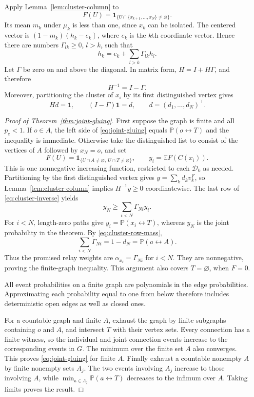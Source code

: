 \documentclass[11pt]{article}
\theoremstyle{definition}
\begin{document}
Apply Lemma~\ref{lem:cluster-column} to
\[
 F(U)=\mathbf1_{\{U\cap\{x_{k+1},\ldots,x_N\}\ne\varnothing\}}.
\]
Its mean $m_k$ under $\mu_k$ is less than one, since $x_k$ can be
isolated.  The centered vector is $(1-m_k)(h_k-e_k)$, where $e_k$
is the $k$th coordinate vector.  Hence there are numbers
$\Gamma_{lk}\ge0$, $l>k$, such that
\[
 h_k=e_k+\sum_{l>k}\Gamma_{lk}h_l.
\]
Let $\Gamma$ be zero on and above the diagonal.  In matrix form,
$H=I+H\Gamma$, and therefore
\begin{equation}
\label{eq:cluster-inverse}
 H^{-1}=I-\Gamma.
\end{equation}
Moreover, partitioning the cluster of $x_i$ by its first distinguished
vertex gives
\begin{equation}
\label{eq:cluster-row-mass}
 Hd=\mathbf1,\qquad (I-\Gamma)\mathbf1=d,
 \qquad d=(d_1,\ldots,d_N)^{\mathsf T}.
\end{equation}

\begin{proof}[Proof of Theorem~\ref{thm:joint-gluing}]
First suppose the graph is finite and all $p_e<1$.
If $o\in A$, the left side of \eqref{eq:joint-gluing} equals
$\mathbb P(o\leftrightarrow T)$ and the inequality is immediate.
Otherwise take the distinguished list to consist of the vertices of
$A$ followed by $x_N=o$, and set
\[
 F(U)=\mathbf1_{\{U\cap A\ne\varnothing,\ U\cap T\ne\varnothing\}},
 \qquad y_i=\mathbb E F(C(x_i)).
\]
This is one nonnegative increasing function, restricted to each
$\mathcal D_k$ as needed.  Partitioning by the first distinguished
vertex gives $y=\sum_k d_kv_k^F$, so
Lemma~\ref{lem:cluster-column} implies $H^{-1}y\ge0$ coordinatewise.
The last row of \eqref{eq:cluster-inverse} yields
\[
 y_N\ge\sum_{i<N}\Gamma_{Ni}y_i.
\]
For $i<N$, length-zero paths give $y_i=\mathbb P(x_i\leftrightarrow T)$,
whereas $y_N$ is the joint probability in the theorem.  By
\eqref{eq:cluster-row-mass},
\[
 \sum_{i<N}\Gamma_{Ni}=1-d_N=\mathbb P(o\leftrightarrow A).
\]
Thus the promised relay weights are $\alpha_{x_i}=\Gamma_{Ni}$ for $i<N$.
They are nonnegative, proving the finite-graph inequality.
This argument also covers $T=\varnothing$, when $F=0$.

All event probabilities on a finite graph are polynomials in the edge
probabilities.  Approximating each probability equal to one from below
therefore includes deterministic open edges as well as closed ones.

For a countable graph and finite $A$, exhaust the graph by finite
subgraphs containing $o$ and $A$, and intersect $T$ with their vertex
sets.  Every connection has a finite witness, so the individual and
joint connection events increase to the corresponding events in $G$.
The minimum over the finite set $A$ also converges.  This proves
\eqref{eq:joint-gluing} for finite $A$.  Finally exhaust a countable
nonempty $A$ by finite nonempty sets $A_j$.  The two events involving
$A_j$ increase to those involving $A$, while
$\min_{a\in A_j}\mathbb P(a\leftrightarrow T)$ decreases to the infimum
over $A$.  Taking limits proves the result.
\end{proof}
\end{document}
